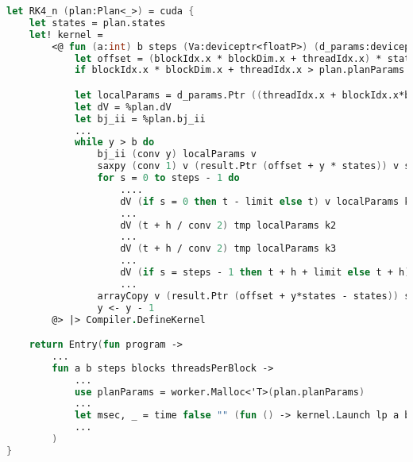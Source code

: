 \begin{lstlisting}[language=FSharp, caption=Parameterized RK4\_n kernel in F\# Alea.cuBase, label=cubase_rk4nparams]
let RK4_n (plan:Plan<_>) = cuda {
    let states = plan.states
    let! kernel =
        <@ fun (a:int) b steps (Va:deviceptr<floatP>) (d_params:deviceptr<floatP>) (result:deviceptr<floatP>) ->
            let offset = (blockIdx.x * blockDim.x + threadIdx.x) * states * (a + 1)
            if blockIdx.x * blockDim.x + threadIdx.x > plan.planParams.Length/plan.paramCount then () else

            let localParams = d_params.Ptr ((threadIdx.x + blockIdx.x*blockDim.x)*plan.paramCount)
            let dV = %plan.dV
            let bj_ii = %plan.bj_ii
            ...
            while y > b do
                bj_ii (conv y) localParams v
                saxpy (conv 1) v (result.Ptr (offset + y * states)) v states
                for s = 0 to steps - 1 do
                    ....
                    dV (if s = 0 then t - limit else t) v localParams k1
                    ...
                    dV (t + h / conv 2) tmp localParams k2
                    ...
                    dV (t + h / conv 2) tmp localParams k3
                    ...
                    dV (if s = steps - 1 then t + h + limit else t + h) tmp localParams k4
                    ...
                arrayCopy v (result.Ptr (offset + y*states - states)) states
                y <- y - 1
        @> |> Compiler.DefineKernel 

    return Entry(fun program ->
        ...
        fun a b steps blocks threadsPerBlock ->
            ...
            use planParams = worker.Malloc<'T>(plan.planParams)
            ...
            let msec, _ = time false "" (fun () -> kernel.Launch lp a b steps Va.Ptr planParams.Ptr result.Ptr)
            ...
        )
}
\end{lstlisting}

